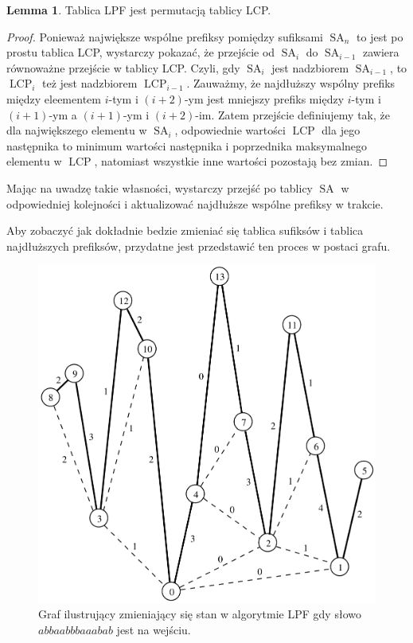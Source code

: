 \documentclass[a4paper,12pt]{article}
\theoremstyle{definition}
\newtheorem{lemma}{Lemma}[section]
\DeclareMathOperator{\SA}{SA}
\DeclareMathOperator{\LCP}{LCP}
\begin{document}
\begin{lemma}

Tablica LPF jest permutacją tablicy LCP.

\begin{proof}

Ponieważ największe wspólne prefiksy pomiędzy sufiksami $\SA_{n}$ to jest po prostu tablica LCP,
 wystarczy pokazać, że przejście od $\SA_{i}$ do $\SA_{i - 1}$ zawiera równoważne przejście w tablicy LCP.
Czyli, gdy $\SA_{i}$ jest nadzbiorem $\SA_{i - 1}$, to $\LCP_{i}$ też jest nadzbiorem $\LCP_{i - 1}$.
Zauważmy, że najdłuższy wspólny prefiks między eleementem $i$-tym i $(i + 2)$-ym jest mniejszy prefiks między $i$-tym i $(i + 1)$-ym a $(i + 1)$-ym i $(i + 2)$-im.
Zatem przejście definiujemy tak, że dla największego elementu w $\SA_{i}$, odpowiednie wartości $\LCP$ dla jego następnika
 to minimum wartości następnika i poprzednika maksymalnego elementu w $\LCP$, natomiast wszystkie inne wartości pozostają bez zmian.

\end{proof}
\end{lemma}

Mając na uwadzę takie własności, wystarczy przejść po tablicy $\SA$ w odpowiedniej kolejności 
 i aktualizować najdłuższe wspólne prefiksy w trakcie.

Aby zobaczyć jak dokładnie bedzie zmieniać się tablica sufiksów i tablica najdłuższych prefiksów,
 przydatne jest przedstawić ten proces w postaci grafu.

\begin{figure}[h!]
  \center
  \includegraphics[width=0.6\linewidth]{graph}
  \caption{Graf ilustrujący zmieniający się stan w algorytmie LPF gdy słowo $abbaabbbaaabab$ jest na wejściu.}
\end{figure}
\end{document}
